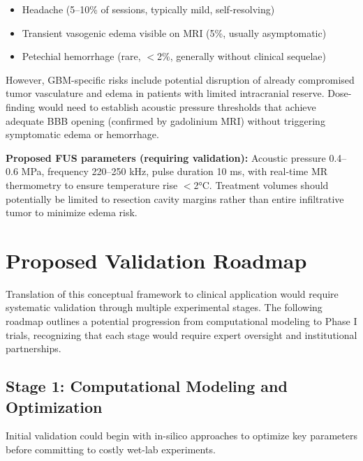 \documentclass[12pt]{article}
\begin{document}
\begin{itemize}[leftmargin=*,noitemsep]
\item Headache (5--10\% of sessions, typically mild, self-resolving)
\item Transient vasogenic edema visible on MRI (5\%, usually asymptomatic)
\item Petechial hemorrhage (rare, $<$2\%, generally without clinical sequelae)
\end{itemize}

However, GBM-specific risks include potential disruption of already compromised tumor vasculature and edema in patients with limited intracranial reserve. Dose-finding would need to establish acoustic pressure thresholds that achieve adequate BBB opening (confirmed by gadolinium MRI) without triggering symptomatic edema or hemorrhage.

\textbf{Proposed FUS parameters (requiring validation):} Acoustic pressure 0.4--0.6 MPa, frequency 220--250 kHz, pulse duration 10 ms, with real-time MR thermometry to ensure temperature rise $<$2°C. Treatment volumes should potentially be limited to resection cavity margins rather than entire infiltrative tumor to minimize edema risk.

\section{Proposed Validation Roadmap}

Translation of this conceptual framework to clinical application would require systematic validation through multiple experimental stages. The following roadmap outlines a potential progression from computational modeling to Phase I trials, recognizing that each stage would require expert oversight and institutional partnerships.

\subsection{Stage 1: Computational Modeling and Optimization}
Initial validation could begin with in-silico approaches to optimize key parameters before committing to costly wet-lab experiments.
\end{document}
